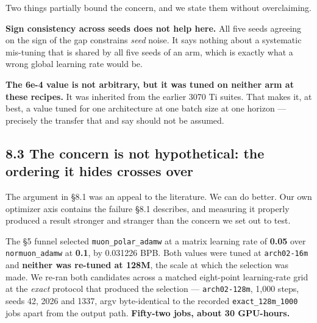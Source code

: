 Two things partially bound the concern, and we state them without overclaiming.

\textbf{Sign consistency across seeds does not help here.} All five seeds agreeing on the sign of the
gap constrains \emph{seed} noise. It says nothing about a systematic mis-tuning that is shared by all
five seeds of an arm, which is exactly what a wrong global learning rate would be.

\textbf{The 6e-4 value is not arbitrary, but it was tuned on neither arm at these recipes.} It was
inherited from the earlier 3070 Ti suites. That makes it, at best, a value tuned for one
architecture at one batch size at one horizon --- precisely the transfer that \cite{ref31} and \cite{ref30} say
should not be assumed.

\subsection{8.3 The concern is not hypothetical: the ordering it hides crosses over}\label{the-concern-is-not-hypothetical-the-ordering-it-hides-crosses-over}

The argument in \S8.1 was an appeal to the literature. We can do better. Our own optimizer axis
contains the failure \S8.1 describes, and measuring it properly produced a result stronger and
stranger than the concern we set out to test.

The \S5 funnel selected \texttt{muon\_polar\_adamw} at a matrix learning rate of \textbf{0.05} over
\texttt{normuon\_adamw} at \textbf{0.1}, by 0.031226 BPB. Both values were tuned at \texttt{arch02-16m} and \textbf{neither
was re-tuned at 128M}, the scale at which the selection was made. We re-ran both candidates across
a matched eight-point learning-rate grid at the \emph{exact} protocol that produced the selection ---
\texttt{arch02-128m}, 1,000 steps, seeds 42, 2026 and 1337, argv byte-identical to the recorded
\texttt{exact\_128m\_1000} jobs apart from the output path. \textbf{Fifty-two jobs, about 30 GPU-hours.}

